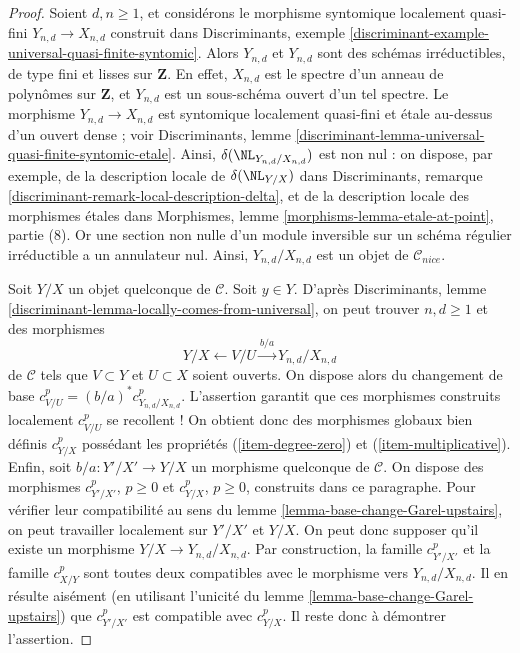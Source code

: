 \begin{proof}
\medskip\noindent
Soient $d, n \geq 1$, et considérons le morphisme syntomique
localement quasi-fini $Y_{n, d} \to X_{n, d}$
construit dans Discriminants, exemple
\ref{discriminant-example-universal-quasi-finite-syntomic}.
Alors $Y_{n, d}$ et $Y_{n, d}$ sont des schémas irréductibles, de type fini et
lisses sur $\mathbf{Z}$. En effet, $X_{n, d}$ est le spectre d'un
anneau de polynômes sur $\mathbf{Z}$, et $Y_{n, d}$ est un sous-schéma ouvert
d'un tel spectre. Le morphisme $Y_{n, d} \to X_{n, d}$ est syntomique localement quasi-fini
et étale au-dessus d'un ouvert dense ; voir Discriminants, lemme
\ref{discriminant-lemma-universal-quasi-finite-syntomic-etale}.
Ainsi, $\delta(\NL_{Y_{n, d}/X_{n, d}})$ est non nul : on dispose, par exemple,
de la description locale de $\delta(\NL_{Y/X})$ dans
Discriminants, remarque \ref{discriminant-remark-local-description-delta},
et de la description locale des morphismes étales dans
Morphismes, lemme \ref{morphisms-lemma-etale-at-point}, partie (8).
Or une section non nulle d'un module inversible sur un schéma
régulier irréductible a un annulateur nul. Ainsi,
$Y_{n, d}/X_{n, d}$ est un objet de $\mathcal{C}_{nice}$.

\medskip\noindent
Soit $Y/X$ un objet quelconque de $\mathcal{C}$. Soit $y \in Y$.
D'après Discriminants, lemme \ref{discriminant-lemma-locally-comes-from-universal},
on peut trouver $n, d \geq 1$ et des morphismes
$$
Y/X \leftarrow V/U \xrightarrow{b/a} Y_{n, d}/X_{n, d}
$$
de $\mathcal{C}$ tels que $V \subset Y$ et $U \subset X$ soient ouverts.
On dispose alors du changement de base $c^p_{V/U} = (b/a)^*c^p_{Y_{n, d}/X_{n, d}}$.
L'assertion garantit que ces morphismes construits localement $c^p_{V/U}$ se recollent !
On obtient donc des morphismes globaux bien définis $c^p_{Y/X}$ possédant les propriétés
(\ref{item-degree-zero}) et (\ref{item-multiplicative}).
Enfin, soit $b/a : Y'/X' \to Y/X$ un morphisme quelconque de $\mathcal{C}$.
On dispose des morphismes $c^p_{Y'/X'}$, $p \geq 0$ et $c^p_{Y/X}$, $p \geq 0$,
construits dans ce paragraphe. Pour vérifier leur compatibilité au sens du
lemme \ref{lemma-base-change-Garel-upstairs}, on peut travailler localement
sur $Y'/X'$ et $Y/X$. On peut donc supposer qu'il existe un morphisme
$Y/X \to Y_{n, d}/X_{n, d}$. Par construction, la famille
$c^p_{Y'/X'}$ et la famille $c^p_{X/Y}$ sont toutes deux compatibles avec
le morphisme vers $Y_{n, d}/X_{n, d}$. Il en résulte aisément
(en utilisant l'unicité du lemme \ref{lemma-base-change-Garel-upstairs})
que $c^p_{Y'/X'}$ est compatible avec $c^p_{Y/X}$.
Il reste donc à démontrer l'assertion.


\end{proof}
